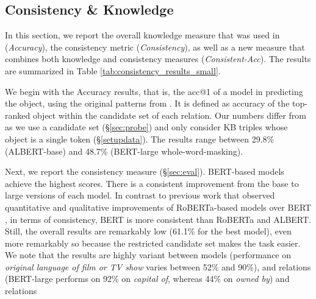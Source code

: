 


\subsection{Consistency \& Knowledge}
 In this section, we report
the overall knowledge measure that was used in \citet{lama} (\textit{Accuracy}),
the consistency metric (\textit{Consistency}), as well as a new measure that combines both knowledge and consistency measures (\textit{Consistent-Acc}). 
The results are summarized in Table
\ref{tab:consistency_results_small}.

We begin with the Accuracy results, that is, the acc@1 of a
model in predicting the object, using the original patterns
from \citet{lama}. It is defined as accuracy of the
top-ranked object within the candidate set of each
relation. Our numbers differ from \citet{lama} as we use a
candidate set (\S\ref{sec:probe}) and only consider KB
triples whose object is a single token
(\S\ref{setupdata}). The results range between 29.8\%
(ALBERT-base) and 48.7\% (BERT-large whole-word-masking).

Next, we report the consistency measure (\S\ref{sec:eval}).
BERT-based models achieve the highest scores. There is a consistent improvement from the {base} to {large} versions of each model.
In contrast to previous work that observed quantitative and qualitative improvements of RoBERTa-based models over BERT \cite{roberta,talmor2019olmpics}, in terms of consistency, BERT is more consistent than RoBERTa and ALBERT.
Still, the overall results are remarkably low (61.1\% for
the best model), %
even more remarkably so because the restricted candidate set
makes the task easier.
We note that the results are highly variant between models
 (performance on \textit{original language of film or TV show} varies between 52\% and 90\%), and relations (BERT-large performs on 92\% on \textit{capital of}, whereas 44\% on \textit{owned by})
and relations


